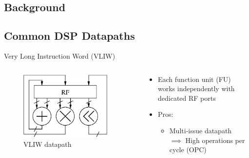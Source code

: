 \documentclass{beamer}
\begin{document}
\begin{CJK}{UTF8}{bkai}
            \section{Background}
            \subsection{Common DSP Datapaths}
            \begin{frame}{Very Long Instruction Word (VLIW)}
                \begin{columns}
                    \begin{column}{0.4\textwidth}
                        \begin{figure}[!ht]
                            \centering
                            \includegraphics[width=0.9\textwidth]{./figs/vliw.eps}
                            \caption{VLIW datapath}
                        \end{figure}
                    \end{column}
                    \begin{column}{0.6\textwidth}
                        \begin{itemize}
                            \item <2-> {Each function unit (FU) works independently with dedicated RF ports
                                }
                            \item <3-> {Pros:
                                    \begin{itemize}
                                        \item Multi-issue datapath \\ $\implies$ High operations per cycle (OPC)

\end{itemize}}
\end{itemize}
\end{column}
\end{columns}
\end{frame}
\end{CJK}
\end{document}
